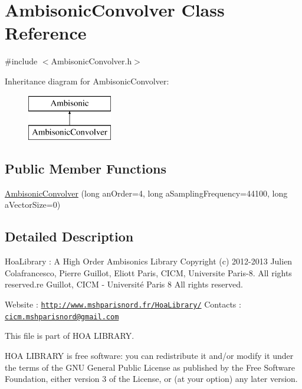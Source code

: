 \hypertarget{class_ambisonic_convolver}{\section{Ambisonic\-Convolver Class Reference}
\label{class_ambisonic_convolver}
}


{\ttfamily \#include $<$Ambisonic\-Convolver.\-h$>$}

Inheritance diagram for Ambisonic\-Convolver\-:\begin{figure}[H]
\begin{center}
\leavevmode
\includegraphics[height=2.000000cm]{class_ambisonic_convolver}
\end{center}
\end{figure}
\subsection*{Public Member Functions}
\begin{DoxyCompactItemize}
\item 
\hyperlink{class_ambisonic_convolver_a738ca279b391cf1adba9e2004ac74c52}{Ambisonic\-Convolver} (long an\-Order=4, long a\-Sampling\-Frequency=44100, long a\-Vector\-Size=0)
\end{DoxyCompactItemize}


\subsection{Detailed Description}
Hoa\-Library \-: A High Order Ambisonics Library Copyright (c) 2012-\/2013 Julien Colafrancesco, Pierre Guillot, Eliott Paris, C\-I\-C\-M, Universite Paris-\/8. All rights reserved.\-re Guillot, C\-I\-C\-M -\/ Université Paris 8 All rights reserved.

Website \-: \href{http://www.mshparisnord.fr/HoaLibrary/}{\tt http\-://www.\-mshparisnord.\-fr/\-Hoa\-Library/} Contacts \-: \href{mailto:cicm.mshparisnord@gmail.com}{\tt cicm.\-mshparisnord@gmail.\-com}

This file is part of H\-O\-A L\-I\-B\-R\-A\-R\-Y.

H\-O\-A L\-I\-B\-R\-A\-R\-Y is free software\-: you can redistribute it and/or modify it under the terms of the G\-N\-U General Public License as published by the Free Software Foundation, either version 3 of the License, or (at your option) any later version.

